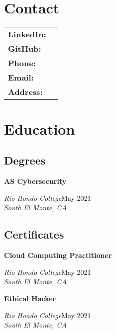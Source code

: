 \documentclass[a4paper]{article}
\begin{document}
\begin{minipage}[t]{0.36\textwidth}
    \raggedright
    \vspace*{0pt}
    {\bfseries\LARGE\textsf\appfirstname{}} \\
    {\bfseries\LARGE\textsf\applastname{}}

    \section{Contact}
    \begin{tabular}{ lp{4.6cm} }
        \textbf{LinkedIn:} & \textsf{\applinkedinurl{}} \\
        \textbf{GitHub:} & \textsf{\appgithuburl{}} \\
        \textbf{Phone:} & \textsf{\appcellphone{}} \\
        \textbf{Email:} & \textsf{\appemail{}} \\
        \textbf{Address:} & \textsf{\appaddress{}}
    \end{tabular}

    \section{Education}
    \subsection{Degrees}
    \textbf{AS Cybersecurity}\par
    \textit{Rio Hondo College}\hfill May 2021 \\
    \textit{South El Monte, CA}

    \subsection{Certificates}
    \textbf{Cloud Computing Practitioner}\par
    \textit{Rio Hondo College}\hfill May 2021 \\
    \textit{South El Monte, CA}

    \textbf{Ethical Hacker}\par
    \textit{Rio Hondo College}\hfill May 2021 \\
    \textit{South El Monte, CA}
\end{minipage}\hfill
\end{document}
